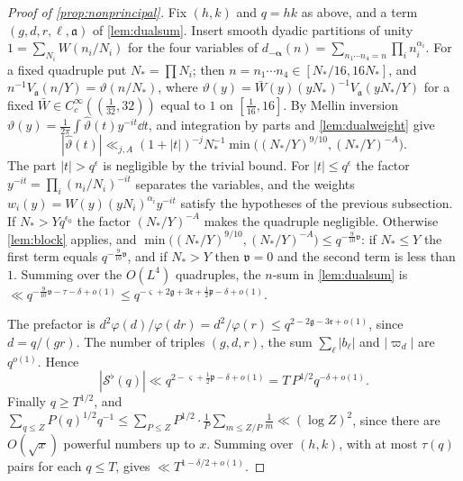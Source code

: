 \documentclass[11pt,colorlinks]{charlie}
\begin{document}
\begin{proof}[Proof of \cref{prop:nonprincipal}]
Fix $(h,k)$ and $q=hk$ as above, and a term $(g,d,r,\ell,\mathfrak a)$ of \cref{lem:dualsum}. Insert smooth dyadic partitions of unity $1=\sum_{N_i}W(n_i/N_i)$ for the four variables of $d_{-\boldsymbol\alpha}(n)=\sum_{n_1\cdots n_4=n}\prod_in_i^{\alpha_i}$. For a fixed quadruple put $N_*=\prod N_i$; then $n=n_1\cdots n_4\in[N_*/16,16N_*]$, and $n^{-1}V_{\mathfrak a}(n/Y)=\vartheta(n/N_*)$, where $\vartheta(y)=\bar W(y)(yN_*)^{-1}V_{\mathfrak a}(yN_*/Y)$ for a fixed $\bar W\in C_c^\infty((\frac1{32},32))$ equal to $1$ on $[\frac1{16},16]$. By Mellin inversion $\vartheta(y)=\frac1{2\pi}\int\widehat\vartheta(t)y^{-it}\dd t$, and integration by parts and \cref{lem:dualweight} give
\[
 |\widehat\vartheta(t)|\ll_{j,A}(1+|t|)^{-j}N_*^{-1}\min\big((N_*/Y)^{9/10},(N_*/Y)^{-A}\big).
\]
The part $|t|>q^\epsilon$ is negligible by the trivial bound. For $|t|\le q^\epsilon$ the factor $y^{-it}=\prod_i(n_i/N_i)^{-it}$ separates the variables, and the weights $w_i(y)=W(y)(yN_i)^{\alpha_i}y^{-it}$ satisfy the hypotheses of the previous subsection. If $N_*>Yq^{\epsilon_0}$ the factor $(N_*/Y)^{-A}$ makes the quadruple negligible. Otherwise \cref{lem:block} applies, and $\min\big((N_*/Y)^{9/10},(N_*/Y)^{-A}\big)\le q^{-\frac9{10}\mathfrak v}$: if $N_*\le Y$ the first term equals $q^{-\frac9{10}\mathfrak v}$, and if $N_*>Y$ then $\mathfrak v=0$ and the second term is less than $1$. Summing over the $O(L^4)$ quadruples, the $n$-sum in \cref{lem:dualsum} is $\ll q^{-\frac9{10}\mathfrak v-\tau-\delta+o(1)}\le q^{-\varsigma+2\mathfrak g+3\mathfrak r+\frac12\mathfrak p-\delta+o(1)}$.

The prefactor is $d^2\varphi(d)/\varphi(dr)=d^2/\varphi(r)\le q^{2-2\mathfrak g-3\mathfrak r+o(1)}$, since $d=q/(gr)$. The number of triples $(g,d,r)$, the sum $\sum_\ell|b_\ell|$ and $|\varpi_d|$ are $q^{o(1)}$. Hence
\[
 |\mathcal S^\flat(q)|\ll q^{2-\varsigma+\frac12\mathfrak p-\delta+o(1)}=T\,P^{1/2}q^{-\delta+o(1)} .
\]
Finally $q\ge T^{1/2}$, and $\sum_{q\le Z}P(q)^{1/2}q^{-1}\le\sum_{P\le Z}P^{1/2}\cdot\frac{1}{P}\sum_{m\le Z/P}\frac1m\ll(\log Z)^2$, since there are $O(\sqrt x)$ powerful numbers up to $x$. Summing over $(h,k)$, with at most $\tau(q)$ pairs for each $q\le T$, gives $\ll T^{1-\delta/2+o(1)}$.
\end{proof}
\end{document}
